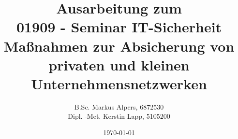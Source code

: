 \documentclass[11pt, a4paper, twoside]{book}
\begin{document}
	
	
	\title{Ausarbeitung zum \\ 01909 - Seminar IT-Sicherheit \\ Maßnahmen zur Absicherung von privaten und kleinen Unternehmensnetzwerken}
	\author{B.Sc. Markus Alpers, 6872530 \\ Dipl. -Met. Kerstin Lapp, 5105200}
	\date{\today}
	
	\maketitle
	
	
	\tableofcontents
	
	
	
	
	


	
	
	\renewcommand{\indexname}{Stichwortverzeichnis}		%
	\printindex
	\nocite{*} %
	
\end{document}

